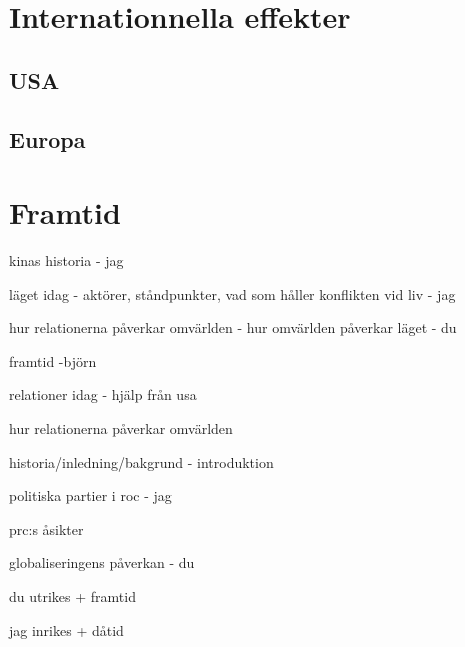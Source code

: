 \documentclass[a4paper,10pt]{article}
\begin{document}
\section{Internationnella effekter}

\subsection{USA}

\subsection{Europa}

\section{Framtid}


kinas historia - jag

läget idag - aktörer, ståndpunkter, vad som håller konflikten vid liv - jag

hur relationerna påverkar omvärlden - hur omvärlden påverkar läget - du

framtid -björn


relationer idag - hjälp från usa

hur relationerna påverkar omvärlden

historia/inledning/bakgrund - introduktion

politiska partier i roc - jag

prc:s åsikter

globaliseringens påverkan - du


du utrikes + framtid

jag inrikes + dåtid
\end{document}
